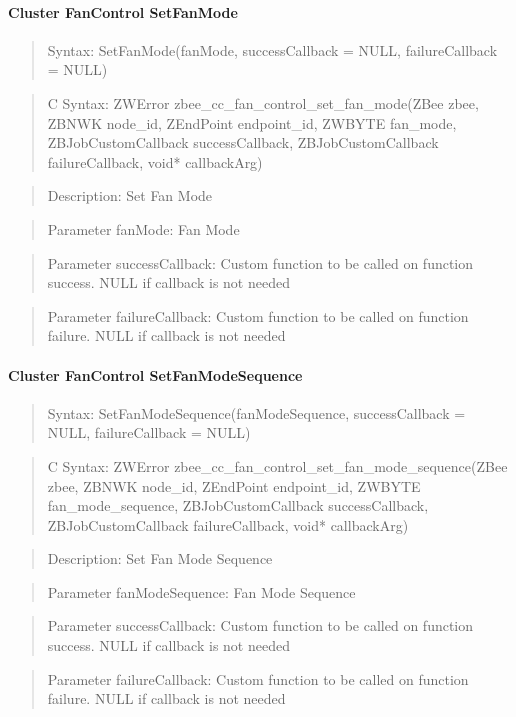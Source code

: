 \paragraph{Cluster FanControl SetFanMode}
\begin{quote}Syntax: SetFanMode(fanMode, successCallback = NULL, failureCallback = NULL)\end{quote}
\begin{quote}C Syntax: ZWError zbee\_cc\_fan\_control\_set\_fan\_mode(ZBee zbee, ZBNWK node\_id, ZEndPoint endpoint\_id, ZWBYTE fan\_mode, ZBJobCustomCallback successCallback, ZBJobCustomCallback failureCallback, void* callbackArg)\end{quote}
\begin{quote}Description: Set Fan Mode\end{quote}
\begin{quote}Parameter fanMode: Fan Mode\end{quote}
\begin{quote}Parameter successCallback: Custom function to be called on function success. NULL if callback is not needed\end{quote}
\begin{quote}Parameter failureCallback: Custom function to be called on function failure. NULL if callback is not needed\end{quote}


\paragraph{Cluster FanControl SetFanModeSequence}
\begin{quote}Syntax: SetFanModeSequence(fanModeSequence, successCallback = NULL, failureCallback = NULL)\end{quote}
\begin{quote}C Syntax: ZWError zbee\_cc\_fan\_control\_set\_fan\_mode\_sequence(ZBee zbee, ZBNWK node\_id, ZEndPoint endpoint\_id, ZWBYTE fan\_mode\_sequence, ZBJobCustomCallback successCallback, ZBJobCustomCallback failureCallback, void* callbackArg)\end{quote}
\begin{quote}Description: Set Fan Mode Sequence\end{quote}
\begin{quote}Parameter fanModeSequence: Fan Mode Sequence\end{quote}
\begin{quote}Parameter successCallback: Custom function to be called on function success. NULL if callback is not needed\end{quote}
\begin{quote}Parameter failureCallback: Custom function to be called on function failure. NULL if callback is not needed\end{quote}



